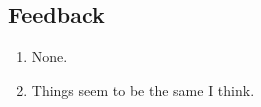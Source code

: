 \documentclass[11pt]{article}
\begin{document}
\subsection*{Feedback}
\begin{enumerate}
    \item None.
    \item Things seem to be the same I think.
\end{enumerate}
\end{document}
